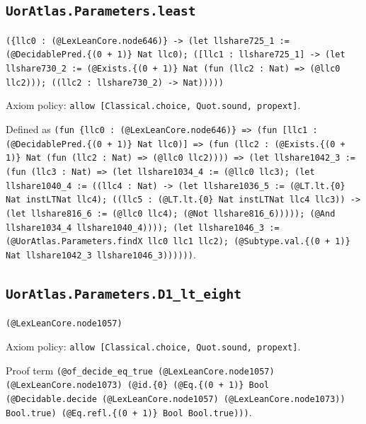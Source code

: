 \documentclass[11pt]{article}
\begin{document}
\subsection*{\texttt{UorAtlas.Parameters.least}}
\noindent\texttt{(\{llc0 : (@LexLeanCore.node646)\} -> (let llshare725\_1 := (@DecidablePred.\{(0 + 1)\} Nat llc0); ([llc1 : llshare725\_1] -> (let llshare730\_2 := (@Exists.\{(0 + 1)\} Nat (fun (llc2 : Nat) => (@llc0 llc2))); ((llc2 : llshare730\_2) -> Nat)))))}\par
\noindent Axiom policy: \texttt{allow [Classical.choice, Quot.sound, propext]}.\par
\noindent Defined as \texttt{(fun \{llc0 : (@LexLeanCore.node646)\} => (fun [llc1 : (@DecidablePred.\{(0 + 1)\} Nat llc0)] => (fun (llc2 : (@Exists.\{(0 + 1)\} Nat (fun (llc2 : Nat) => (@llc0 llc2)))) => (let llshare1042\_3 := (fun (llc3 : Nat) => (let llshare1034\_4 := (@llc0 llc3); (let llshare1040\_4 := ((llc4 : Nat) -> (let llshare1036\_5 := (@LT.lt.\{0\} Nat instLTNat llc4); ((llc5 : (@LT.lt.\{0\} Nat instLTNat llc4 llc3)) -> (let llshare816\_6 := (@llc0 llc4); (@Not llshare816\_6))))); (@And llshare1034\_4 llshare1040\_4)))); (let llshare1046\_3 := (@UorAtlas.Parameters.findX llc0 llc1 llc2); (@Subtype.val.\{(0 + 1)\} Nat llshare1042\_3 llshare1046\_3))))))}.\par
\subsection*{\texttt{UorAtlas.Parameters.D1\_lt\_eight}}
\noindent\texttt{(@LexLeanCore.node1057)}\par
\noindent Axiom policy: \texttt{allow [Classical.choice, Quot.sound, propext]}.\par
\noindent Proof term \texttt{(@of\_decide\_eq\_true (@LexLeanCore.node1057) (@LexLeanCore.node1073) (@id.\{0\} (@Eq.\{(0 + 1)\} Bool (@Decidable.decide (@LexLeanCore.node1057) (@LexLeanCore.node1073)) Bool.true) (@Eq.refl.\{(0 + 1)\} Bool Bool.true)))}.\par
\end{document}
